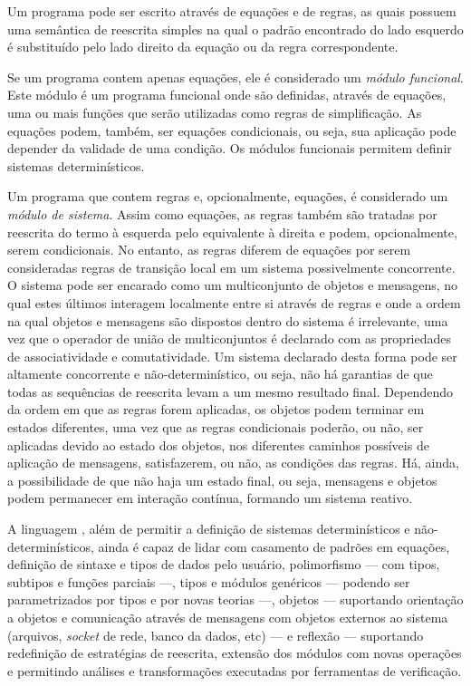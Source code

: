 Um programa \Maude pode ser escrito através de equações e de regras, as quais possuem uma semântica de reescrita simples na qual o padrão encontrado do lado esquerdo é substituído pelo lado direito da equação ou da regra correspondente.

Se um programa \Maude contem apenas equações, ele é considerado um \textit{módulo funcional}.
Este módulo é um programa funcional onde são definidas, através de equações, uma ou mais funções que serão utilizadas como regras de simplificação.
As equações podem, também, ser equações condicionais, ou seja, sua aplicação pode depender da validade de uma condição.
Os módulos funcionais permitem definir sistemas determinísticos.

Um programa que contem regras e, opcionalmente, equações, é considerado um \textit{módulo de sistema}.
Assim como equações, as regras também são tratadas por reescrita do termo à esquerda pelo equivalente à direita e podem, opcionalmente, serem condicionais.
No entanto, as regras diferem de equações por serem consideradas regras de transição local em um sistema possivelmente concorrente.
O sistema pode ser encarado como um multiconjunto de objetos e mensagens, no qual estes últimos interagem localmente entre si através de regras e onde a ordem na qual objetos e mensagens são dispostos dentro do sistema é irrelevante, uma vez que o operador de união de multiconjuntos é declarado com as propriedades de associatividade e comutatividade.
Um sistema declarado desta forma pode ser altamente concorrente e não-determinístico, ou seja, não há garantias de que todas as sequências de reescrita levam a um mesmo resultado final.
Dependendo da ordem em que as regras forem aplicadas, os objetos podem terminar em estados diferentes, uma vez que as regras condicionais poderão, ou não, ser aplicadas devido ao estado dos objetos, nos diferentes caminhos possíveis de aplicação de mensagens, satisfazerem, ou não, as condições das regras.
Há, ainda, a possibilidade de que não haja um estado final, ou seja, mensagens e objetos podem permanecer em interação contínua, formando um sistema reativo.

A linguagem \Maude, além de permitir a definição de sistemas determinísticos e não-determinísticos, ainda é capaz de lidar com casamento de padrões em equações, definição de sintaxe e tipos de dados pelo usuário, polimorfismo --- com tipos, subtipos e funções parciais ---, tipos e módulos genéricos  --- podendo ser parametrizados por tipos e por novas teorias ---, objetos --- suportando orientação a objetos e comunicação através de mensagens com objetos externos ao sistema (arquivos, 
\textit{socket} de rede, banco da dados, etc) --- e reflexão --- suportando redefinição de estratégias de reescrita, extensão dos módulos com novas operações e permitindo análises e transformações executadas por ferramentas de verificação.

